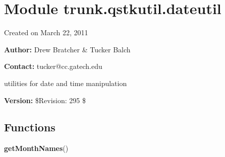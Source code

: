 %
%
%


\section{Module trunk.qstkutil.dateutil}

    \label{trunk:qstkutil:dateutil}
Created on March 22, 2011

\textbf{Author:} Drew Bratcher \& Tucker Balch



\textbf{Contact:} tucker@cc.gatech.edu

utilities for date and time manipulation



\textbf{Version:} \$Revision: 295 \$





  \subsection{Functions}

    \label{trunk:qstkutil:dateutil:getMonthNames}

    \vspace{0.5ex}

\hspace{.8\funcindent}\begin{boxedminipage}{\funcwidth}

    \raggedright \textbf{getMonthNames}()

\setlength{\parskip}{2ex}
\setlength{\parskip}{1ex}
    \end{boxedminipage}

